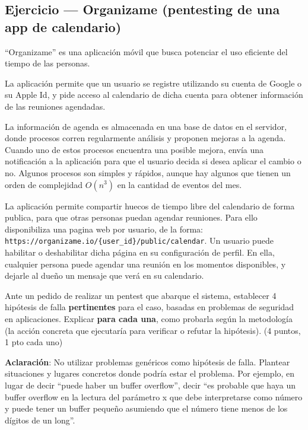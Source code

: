 \subsection{Ejercicio --- Organizame (pentesting de una app de calendario)}

\begin{consigna}
``Organizame'' es una aplicación móvil que busca potenciar el uso eficiente del tiempo de
las personas.

La aplicación permite que un usuario se registre utilizando su cuenta de Google o su Apple
Id, y pide acceso al calendario de dicha cuenta para obtener información de las reuniones
agendadas.

La información de agenda es almacenada en una base de datos en el servidor, donde procesos
corren regularmente análisis y proponen mejoras a la agenda. Cuando uno de estos procesos
encuentra una posible mejora, envía una notificación a la aplicación para que el usuario
decida si desea aplicar el cambio o no. Algunos procesos son simples y rápidos, aunque hay
algunos que tienen un orden de complejidad $O(n^3)$ en la cantidad de eventos del mes.

La aplicación permite compartir huecos de tiempo libre del calendario de forma publica,
para que otras personas puedan agendar reuniones. Para ello disponibiliza una pagina web
por usuario, de la forma: \texttt{https://organizame.io/\{user\_id\}/public/calendar}. Un
usuario puede habilitar o deshabilitar dicha página en su configuración de perfil. En ella,
cualquier persona puede agendar una reunión en los momentos disponibles, y dejarle al dueño
un mensaje que verá en su calendario.

Ante un pedido de realizar un pentest que abarque el sistema, establecer 4 hipótesis de
falla \textbf{pertinentes} para el caso, basadas en problemas de seguridad en aplicaciones.
Explicar \textbf{para cada una}, como probarla según la metodología (la acción concreta que
ejecutaría para verificar o refutar la hipótesis). (4 puntos, 1 pto cada uno)

\textbf{Aclaración}: No utilizar problemas genéricos como hipótesis de falla. Plantear
situaciones y lugares concretos donde podría estar el problema. Por ejemplo, en lugar de
decir ``puede haber un buffer overflow'', decir ``es probable que haya un buffer overflow
en la lectura del parámetro x que debe interpretarse como número y puede tener un buffer
pequeño asumiendo que el número tiene menos de los dígitos de un long''.
\end{consigna}

